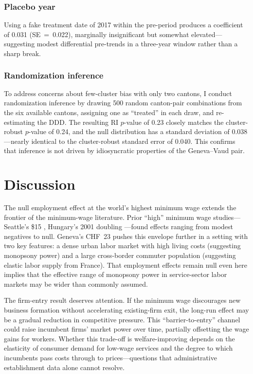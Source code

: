 \documentclass[12pt]{article}
\begin{document}
\subsubsection*{Placebo year} Using a fake treatment date of 2017 within the pre-period produces a coefficient of 0.031 (SE~=~0.022), marginally insignificant but somewhat elevated---suggesting modest differential pre-trends in a three-year window rather than a sharp break.

\subsubsection*{Randomization inference} To address concerns about few-cluster bias with only two cantons, I conduct randomization inference by drawing 500 random canton-pair combinations from the six available cantons, assigning one as ``treated'' in each draw, and re-estimating the DDD. The resulting RI $p$-value of 0.23 closely matches the cluster-robust $p$-value of 0.24, and the null distribution has a standard deviation of 0.038---nearly identical to the cluster-robust standard error of 0.040. This confirms that inference is not driven by idiosyncratic properties of the Geneva--Vaud pair.


\section{Discussion}
\label{sec:discussion}

The null employment effect at the world's highest minimum wage extends the frontier of the minimum-wage literature. Prior ``high'' minimum wage studies---Seattle's \$15 \citep{jardim2022}, Hungary's 2001 doubling \citep{harasztosi2019}---found effects ranging from modest negatives to null. Geneva's CHF~23 pushes this envelope further in a setting with two key features: a dense urban labor market with high living costs (suggesting monopsony power) and a large cross-border commuter population (suggesting elastic labor supply from France). That employment effects remain null even here implies that the effective range of monopsony power in service-sector labor markets may be wider than commonly assumed.

The firm-entry result deserves attention. If the minimum wage discourages new business formation without accelerating existing-firm exit, the long-run effect may be a gradual reduction in competitive pressure. This ``barrier-to-entry'' channel could raise incumbent firms' market power over time, partially offsetting the wage gains for workers. Whether this trade-off is welfare-improving depends on the elasticity of consumer demand for low-wage services and the degree to which incumbents pass costs through to prices---questions that administrative establishment data alone cannot resolve.
\end{document}
